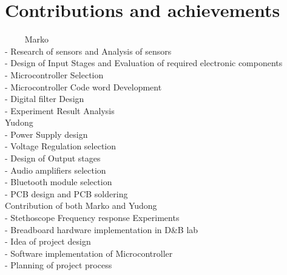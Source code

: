 \chapter*{Contributions and achievements}

~~~~
Marko \\
- Research of sensors and Analysis of sensors \\
- Design of Input Stages and Evaluation of required electronic components  \\
- Microcontroller Selection \\
- Microcontroller Code word Development \\
- Digital filter Design \\
- Experiment Result Analysis \\

Yudong \\
 - Power Supply design \\
 - Voltage Regulation selection \\
 - Design of Output stages \\
 - Audio amplifiers selection \\
 - Bluetooth module selection \\
 - PCB design and PCB soldering \\

Contribution of both Marko and Yudong \\
 - Stethoscope Frequency response Experiments \\ 
 - Breadboard hardware implementation in D\&B lab \\
 - Idea of project design \\
 - Software implementation of Microcontroller \\
 - Planning of project process